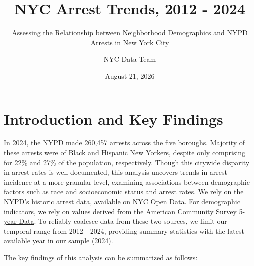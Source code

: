 \documentclass[
]{article}
\title{NYC Arrest Trends, 2012 - 2024}
\subtitle{Assessing the Relationship between Neighborhood Demographics
and NYPD Arrests in New York City}
\author{NYC Data Team}
\date{August 21, 2026}
\begin{document}
\maketitle

{
\setcounter{tocdepth}{2}
\tableofcontents
}
\section{Introduction and Key
Findings}\label{introduction-and-key-findings}

In 2024, the NYPD made 260,457 arrests across the five boroughs.
Majority of these arrests were of Black and Hispanic New Yorkers,
despite only comprising for 22\% and 27\% of the population,
respectively. Though this citywide disparity in arrest rates is
well-documented, this analysis uncovers trends in arrest incidence at a
more granular level, examining associations between demographic factors
such as race and socioeconomic status and arrest rates. We rely on the
\href{https://data.cityofnewyork.us/Public-Safety/NYPD-Arrests-Data-Historic-/8h9b-rp9u/about_data}{NYPD's
historic arrest data}, available on NYC Open Data. For demographic
indicators, we rely on values derived from the
\href{https://www.census.gov/data/developers/data-sets/acs-5year.html}{American
Community Survey 5-year Data}. To reliably coalesce data from these two
sources, we limit our temporal range from 2012 - 2024, providing summary
statistics with the latest available year in our sample (2024).

The key findings of this analysis can be summarized as follows:
\end{document}
